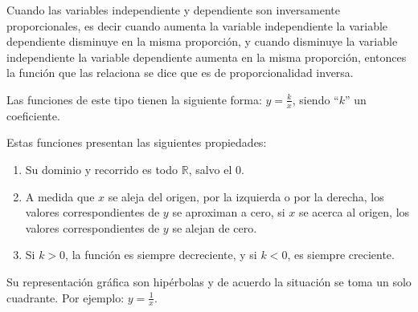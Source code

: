 \documentclass[12pt,a4paper]{article}
\begin{document}
\begin{tcolorbox}[colback=fondorosa,colframe=rojoclaro,title=\textbf{Mini explicacion: Funciones de proporcionalidad inversa},breakable]

Cuando las variables independiente y dependiente son inversamente proporcionales, es decir cuando aumenta la variable independiente la variable dependiente disminuye en la misma proporción, y cuando disminuye la variable independiente la variable dependiente aumenta en la misma proporción, entonces la función que las relaciona se dice que es de proporcionalidad inversa.

Las funciones de este tipo tienen la siguiente forma: $y = \frac{k}{x}$, siendo ``$k$'' un coeficiente.

Estas funciones presentan las siguientes propiedades:

\begin{enumerate}
\item Su dominio y recorrido es todo $\mathbb{R}$, salvo el 0.
\item A medida que $x$ se aleja del origen, por la izquierda o por la derecha, los valores correspondientes de $y$ se aproximan a cero, si $x$ se acerca al origen, los valores correspondientes de $y$ se alejan de cero.
\item Si $k > 0$, la función es siempre decreciente, y si $k < 0$, es siempre creciente.
\end{enumerate}

Su representación gráfica son hipérbolas y de acuerdo la situación se toma un solo cuadrante. Por ejemplo: $y = \frac{1}{x}$.

\begin{center}
\end{center}

\end{tcolorbox}
\end{document}
